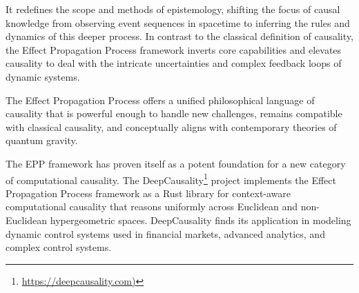 \documentclass{article}
\begin{document}
It redefines the scope and methods of epistemology, shifting the focus of causal knowledge from observing event sequences in spacetime to inferring the rules and dynamics of this deeper process. In contrast to the classical definition of causality, the Effect Propagation Process framework inverts core capabilities and elevates causality to deal with the intricate uncertainties and complex feedback loops of dynamic systems.

The Effect Propagation Process offers a unified philosophical language of causality that is powerful enough to handle new challenges, remains compatible with classical causality, and conceptually aligns with contemporary theories of quantum gravity.

The EPP framework has proven itself as a potent foundation for a new category of computational causality. The DeepCausality\footnote{\url{https://deepcausality.com)}} project implements the Effect Propagation Process framework as a Rust library for context-aware computational causality that reasons uniformly across Euclidean and non-Euclidean hypergeometric spaces. DeepCausality finds its application in modeling dynamic control systems used in financial markets, advanced analytics, and complex control systems.

\newpage

  
  
\end{document}
